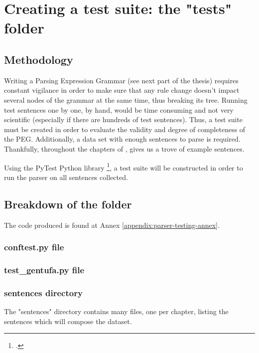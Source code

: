 \chapter{Creating a test suite: the "tests" folder}
\label{chap:creating_a_test_suite}

\section{Methodology}

Writing a Parsing Expression Grammar (see next part of the thesis) requires constant vigilance in order to make sure
that any rule change doesn't impact several nodes of the grammar at the same time, thus breaking its tree. Running test
sentences one by one, by hand, would be time consuming and not very scientific (especially if there are hundreds of test sentences).
Thus, a test suite must be created in order to evaluate the validity and degree of completeness of the PEG.
Additionally, a data set with enough sentences to parse is required. Thankfully, throughout the chapters of ,
\citeauthor{cowan1997complete} gives us a trove of example sentences.\newline

Using the PyTest Python library \footcite{pytest8.3.2}, a test suite will be constructed in order to run the parser on
all sentences collected.

\section{Breakdown of the folder}

The code produced is found at Annex \ref{appendix:parser-testing-annex}.

\subsection*{conftest.py file}

\subsection*{test\_gentufa.py file}

\subsection*{sentences directory}

The "sentences" directory contains many files, one per chapter, listing the sentences which will compose the dataset.

